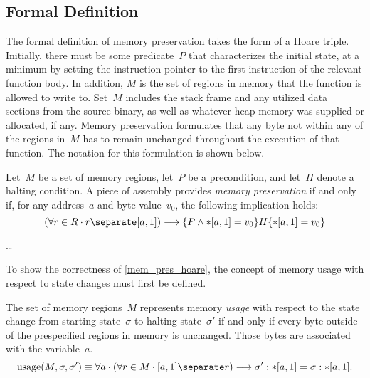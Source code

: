 \subsection{Formal Definition}\label{sse:mem_use_def}
The formal definition of memory preservation takes the form of a Hoare triple.%
%
Initially, there must be some predicate~$P$ that characterizes the initial state,
at a minimum by setting the instruction pointer
to the first instruction of the relevant function body.
In addition, $M$ is the set of regions in memory
that the function is allowed to write to.
Set~$M$ includes the stack frame and any utilized data sections from the source binary,
as well as whatever heap memory was supplied or allocated, if any.
Memory preservation formulates that any byte not within any of the regions in~$M$
has to remain unchanged throughout the execution of that function.
The notation for this formulation is shown below.
\begin{definition}\label{mem_pres_hoare}
  Let~$M$ be a set of memory regions, let~$P$ be a precondition,
  and let~$H$ denote a halting condition.
  A piece of assembly provides \emph{memory preservation} if and only if, for any address~$a$ and byte value~$v_0$, the following implication holds:
  \begin{equation}
  (\forall r\in R\cdot r\separate\region{a}{1})\longrightarrow\htriple{P\wedge \readmem{a}{1}=v_0}{H}{\readmem{a}{1}=v_0}
  \end{equation}
\end{definition}
\begin{example}
\end{example}

\todo\dots

To show the correctness of \cref{mem_pres_hoare},
the concept of memory usage with respect to state changes must first be defined.
\begin{definition}
  The set of memory regions~$M$ represents memory \emph{usage} with respect to
  the state change from starting state~$\sigma$ to halting state~$\sigma'$
  if and only if every byte outside of the prespecified regions in memory is unchanged.
  Those bytes are associated with the variable~$a$.
  \begin{equation}
    \usage(M,\sigma,\sigma')\equiv\forall a\cdot(\forall r\in M\cdot\region{a}1\separate r)
    \longrightarrow\readmemS{\sigma'}a{1}=\readmemS{\sigma}a{1}.
  \end{equation}
\end{definition}
\begin{example}
\end{example}

